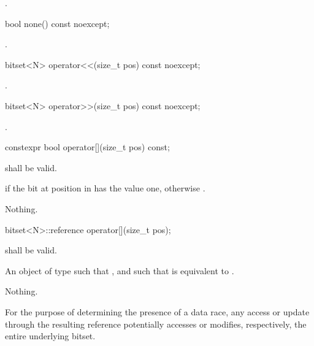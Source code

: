 \begin{itemdescr}
\pnum
\returns
{}.
\end{itemdescr}

%
\begin{itemdecl}
bool none() const noexcept;
\end{itemdecl}

\begin{itemdescr}
\pnum
\returns
{}.
\end{itemdescr}

%
\begin{itemdecl}
bitset<N> operator<<(size_t pos) const noexcept;
\end{itemdecl}

\begin{itemdescr}
\pnum
\returns
{}.
\end{itemdescr}

%
\begin{itemdecl}
bitset<N> operator>>(size_t pos) const noexcept;
\end{itemdecl}

\begin{itemdescr}
\pnum
\returns
{}.
\end{itemdescr}

%
\begin{itemdecl}
constexpr bool operator[](size_t pos) const;
\end{itemdecl}

\begin{itemdescr}
\pnum
\requires
{} shall be valid.

\pnum
\returns
{} if the bit at position  in  has the value
one, otherwise .

\pnum
\throws
Nothing.
\end{itemdescr}

%
\begin{itemdecl}
bitset<N>::reference operator[](size_t pos);
\end{itemdecl}

\begin{itemdescr}
\pnum
\requires
{} shall be valid.

\pnum
\returns
An object of type
such that
,
and such that
is equivalent to
.

\pnum
\throws
Nothing.

\pnum
\remarks
For the purpose of determining the presence of a data
race, any access or update through the resulting
reference potentially accesses or modifies, respectively, the entire
underlying bitset.
\end{itemdescr}

